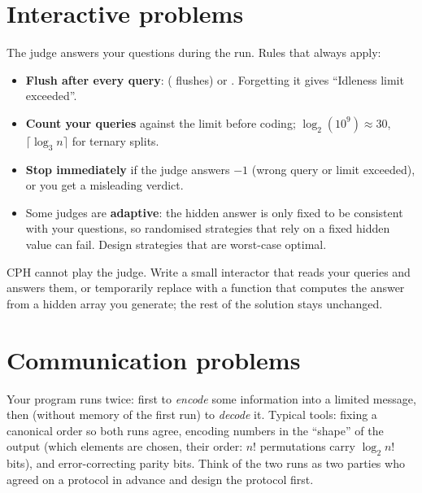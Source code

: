 
\section[Interactive problems]{Interactive problems \hfill \gold}

The judge answers your questions during the run. Rules that always apply:
\begin{itemize}
  \item \textbf{Flush after every query}:  ( flushes) or . Forgetting it gives
        ``Idleness limit exceeded''.
  \item \textbf{Count your queries} against the limit before coding; $\log_2(10^9) \approx 30$, $\lceil\log_3 n\rceil$ for ternary
        splits.
  \item \textbf{Stop immediately} if the judge answers $-1$ (wrong query or limit exceeded), or you get a misleading verdict.
  \item Some judges are \textbf{adaptive}: the hidden answer is only fixed to be consistent with your questions, so randomised
        strategies that rely on a fixed hidden value can fail. Design strategies that are worst-case optimal.
\end{itemize}


\begin{tip}
CPH cannot play the judge. Write a small interactor that reads your queries and answers them, or temporarily replace 
with a function that computes the answer from a hidden array you generate; the rest of the solution stays unchanged.
\end{tip}

\section[Communication problems]{Communication problems \hfill \ioi}

Your program runs twice: first to \emph{encode} some information into a limited message, then (without memory of the first
run) to \emph{decode} it. Typical tools: fixing a canonical order so both runs agree, encoding numbers in the ``shape'' of the
output (which elements are chosen, their order: $n!$ permutations carry $\log_2 n!$ bits), and error-correcting parity bits. Think
of the two runs as two parties who agreed on a protocol in advance and design the protocol first.

